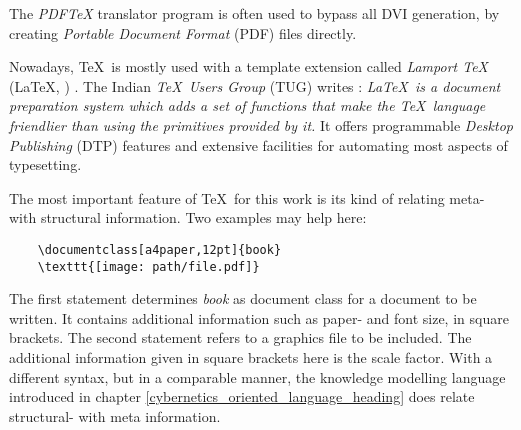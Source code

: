 The \emph{PDFTeX} translator program is often used to bypass all DVI generation,
by creating \emph{Portable Document Format} (PDF) files directly.

Nowadays, \TeX\ is mostly used with a template extension called \emph{Lamport \TeX}
(\LaTeX, \LaTeXe) \cite{latex}. The Indian \emph{\TeX\ Users Group} (TUG) writes
\cite{latextutorial}: \textit{\LaTeX\ is a document preparation system which
adds a set of functions that make the \TeX\ language friendlier than using
the primitives provided by it.} It offers programmable \emph{Desktop Publishing}
(DTP) features and extensive facilities for automating most aspects of
typesetting. \cite{wikipedia}

The most important feature of \TeX\ for this work is its kind of relating meta-
with structural information. Two examples may help here:

\begin{scriptsize}
    \begin{verbatim}
    \documentclass[a4paper,12pt]{book}
    \texttt{[image: path/file.pdf]}
    \end{verbatim}
\end{scriptsize}

The first statement determines \emph{book} as document class for a document to
be written. It contains additional information such as paper- and font size, in
square brackets. The second statement refers to a graphics file to be included.
The additional information given in square brackets here is the scale factor.
With a different syntax, but in a comparable manner, the knowledge modelling
language introduced in chapter \ref{cybernetics_oriented_language_heading} does
relate structural- with meta information.
